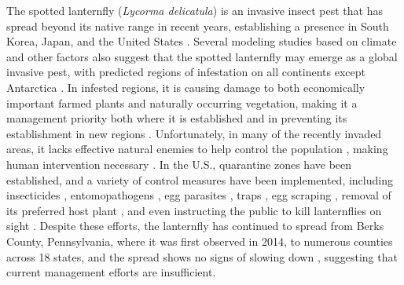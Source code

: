 \documentclass[onecolumn]{article}
\begin{document}
The spotted lanternfly (\textit{Lycorma delicatula}) is an invasive insect pest that has spread beyond its native range in recent years, establishing a presence in South Korea, Japan, and the United States \citep{Dara2015,Barringer2015}. Several modeling studies based on climate and other factors also suggest that the spotted lanternfly may emerge as a global invasive pest, with predicted regions of infestation on all continents except Antarctica \citep{Jung2017,Wakie2020}. In infested regions, it is causing damage to both economically important farmed plants and naturally occurring vegetation, making it a management priority both where it is established \citep{Urban2020} and in preventing its establishment in new regions \citep{EPPO}. Unfortunately, in many of the recently invaded areas, it lacks effective natural enemies to help control the population \citep{Johnson2023,Strombom2024a}, making human intervention necessary \citep{Aphis2018}. In the U.S., quarantine zones have been established, and a variety of control measures have been implemented, including insecticides \citep{Leach2019,Shin2010}, entomopathogens \citep{Clifton2020}, egg parasites \citep{Liu2019a,Wu2023}, traps \citep{Francese2020}, egg scraping \citep{Cooperband2018}, removal of its preferred host plant \citep{Urban2020}, and even instructing the public to kill lanternflies on sight \citep{Urban2023}. Despite these efforts, the lanternfly has continued to spread from Berks County, Pennsylvania, where it was first observed in 2014, to numerous counties across 18 states, and the spread shows no signs of slowing down \citep{NYSIPM2024,Cook2021,Jones2022,Strombom2024b}, suggesting that current management efforts are insufficient.
\end{document}
